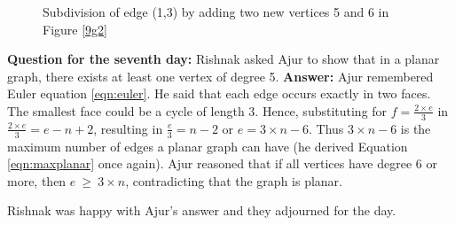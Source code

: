 \begin{figure}[h]
\begin{center}
\caption{ Subdivision of edge (1,3) by adding two new vertices 5 and 6 in Figure \ref{9g2}}\label{9g9}
\end{center}
\end{figure}

\textbf{Question for the seventh day:} Rishnak asked Ajur to show that in a planar graph, there exists at least one vertex of degree 5.
\textbf{Answer:} Ajur remembered Euler equation \ref{eqn:euler}. He said that each edge occurs exactly in two faces. The smallest face could be a cycle of length 3. Hence, substituting for $f=\frac{2 \times e}{3}$ in  
$\frac{2 \times e} {3} =e-n+2$, resulting in $\frac{e}{3}=n-2$ or $e=3\times n -6$. Thus $3 \times n-6$ is the maximum number of edges a planar graph can have (he derived Equation \ref{eqn:maxplanar} once again). Ajur reasoned that if all vertices have degree 6 or more, then $e~\ge~ 3 \times n$, contradicting that the graph is planar.

Rishnak was happy with Ajur's answer and they adjourned for the day.

